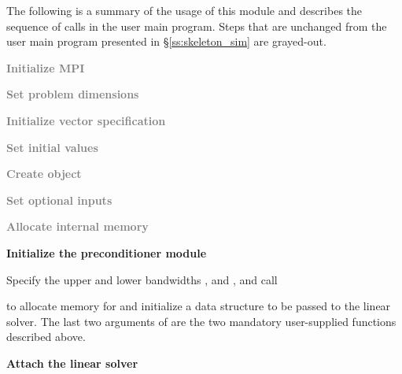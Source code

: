 The following is a summary of the usage of this module and describes the sequence 
of calls in the user main program. Steps that are unchanged from the user main
program presented in \S\ref{ss:skeleton_sim} are grayed-out.
\begin{Steps}
\item 
  \textcolor{gray}{\bf Initialize MPI}

\item
  \textcolor{gray}{\bf Set problem dimensions}

\item
  \textcolor{gray}{\bf Initialize vector specification}

\item
  \textcolor{gray}{\bf Set initial values}
 
\item
  \textcolor{gray}{\bf Create {\cvode} object}

\item
  \textcolor{gray}{\bf Set optional inputs}

\item
  \textcolor{gray}{\bf Allocate internal memory}

\item \label{i:bbdpre_init}
  {\bf Initialize the {\cvbbdpre} preconditioner module}

  Specify the upper and lower bandwidths ,  and
  ,  and call 


  to allocate memory for and initialize a data structure  to be 
  passed to the {\cvspgmr} linear solver. The last two arguments of 
  are the two mandatory user-supplied functions described above.

\item \label{i:bbdpre_attach}
  {\bf Attach the {\cvspgmr} linear solver}



\end{Steps}
